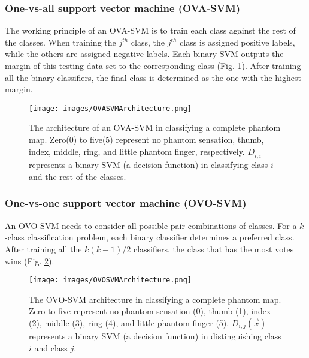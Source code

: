 \subsubsection{One-vs-all support vector machine (OVA-SVM)}
The working principle of an OVA-SVM is to train each class against the rest of the classes. When training the $j^{th}$ class, the $j^{th}$ class is assigned positive labels, while the others are assigned negative labels. Each binary SVM outputs the margin of this testing data set to the corresponding class (Fig. \ref{Fig:OVASVM_architecture}). After training all the binary classifiers, the final class is determined as the one with the highest margin.

\begin{figure}[htb]
    \centering
    \texttt{[image: images/OVASVMArchitecture.png]}
    \caption{The architecture of an OVA-SVM in classifying a complete phantom map. Zero(0) to five(5) represent no phantom sensation, thumb, index, middle, ring, and little phantom finger, respectively. $D_{i,\bar{i}}$ represents a binary SVM (a decision function) in classifying class $i$ and the rest of the classes.}
    \label{Fig:OVASVM_architecture}
\end{figure}

\subsubsection{One-vs-one support vector machine (OVO-SVM)}
\label{subsubsec:OVO}
An OVO-SVM needs to consider all possible pair combinations of classes. 
For a $k$-class classification problem, each binary classifier determines a preferred class. After training all the $k(k-1)/2$ classifiers, the class that has the most votes wins (Fig. \ref{Fig:OVOSVM_architecture}). 

\begin{figure}[htb]
    \centering
    \texttt{[image: images/OVOSVMArchitecture.png]}
	\caption{The OVO-SVM architecture in classifying a complete phantom map. Zero to five represent no phantom sensation (0), thumb (1), index (2), middle (3), ring (4), and little phantom finger (5). $D_{i,j}(\vec{x})$ represents a binary SVM (a decision function) in distinguishing class $i$ and class $j$.}
    \label{Fig:OVOSVM_architecture}
\end{figure}


